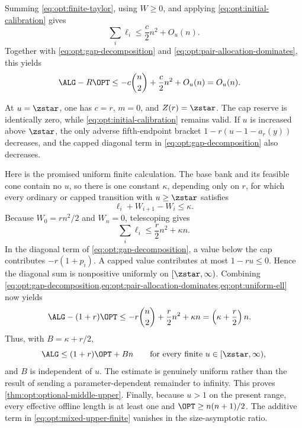 Summing \eqref{eq:opt:finite-taylor}, using $W\ge0$, and applying
\eqref{eq:opt:initial-calibration} gives
\begin{equation}
 \sum_i\ell_i\le\frac c2n^2+O_u(n).
 \label{eq:opt:ell-telescope}
\end{equation}
Together with \eqref{eq:opt:gap-decomposition} and
\eqref{eq:opt:pair-allocation-dominates}, this yields
\begin{align}
 \ALG-R\OPT
 &\le -c\binom n2+\frac c2n^2+O_u(n)
 =O_u(n).
 \label{eq:opt:mixed-upper-finite}
\end{align}

At $u=\zstar$, one has $c=r$, $m=0$, and
$Z(r)=\zstar$.  The cap reserve is identically zero, while
\eqref{eq:opt:initial-calibration} remains valid.  If $u$ is increased
above $\zstar$, the only adverse fifth-endpoint bracket
$1-r(u-1-a_r(y))$ decreases, and the capped diagonal term in
\eqref{eq:opt:gap-decomposition} also decreases.

Here is the promised uniform finite calculation.  The base bank and its
feasible cone contain no $u$, so there is one constant $\kappa$, depending
only on $r$, for which every ordinary or capped transition with $u\ge \zstar$
satisfies
\[
 \ell_i+W_{i+1}-W_i\le\kappa.
\]
Because $W_0=rn^2/2$ and $W_n=0$, telescoping gives
\begin{equation}
 \sum_i\ell_i\le\frac r2n^2+\kappa n.
 \label{eq:opt:uniform-ell}
\end{equation}
In the diagonal term of \cref{eq:opt:gap-decomposition}, a value below the
cap contributes $-r(1+p_i)$.  A capped value contributes at most
$1-r u\le0$.  Hence the diagonal sum is nonpositive uniformly on
$[\zstar,\infty)$.  Combining
\cref{eq:opt:gap-decomposition,eq:opt:pair-allocation-dominates,eq:opt:uniform-ell}
now yields
\begin{align}
 \ALG-(1+r)\OPT
 &\le-r\binom n2+\frac r2n^2+\kappa n
   =\left(\kappa+\frac r2\right)n.
 \label{eq:opt:uniform-high-gap}
\end{align}
Thus, with $B=\kappa+r/2$,
\begin{equation}
 \ALG\le(1+r)\OPT+B n
 \qquad\text{for every finite }u\in[\zstar,\infty),
 \label{eq:opt:uniform-high-upper}
\end{equation}
and $B$ is independent of $u$.  The estimate is genuinely uniform rather
than the result of sending a parameter-dependent remainder to infinity.  This proves
\cref{thm:opt:optional-middle-upper}.  Finally, because $u>1$ on the
present range, every effective offline length is at least one and
$\OPT\ge n(n+1)/2$.  The additive term in
\eqref{eq:opt:mixed-upper-finite} vanishes in the size-asymptotic ratio.

